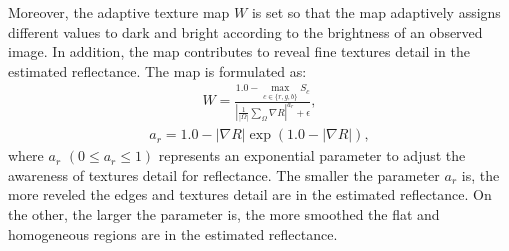 \documentclass[a4paper,twocolumn,10pt]{article}
\begin{document}
Moreover, the adaptive texture map $W$ is set so that the map adaptively assigns different values to dark and bright according to the brightness of an observed image. In addition, the map contributes to reveal fine textures detail in the estimated reflectance. The map is formulated as:
\vspace{-0.3cm}
\begin{eqnarray}
W = \frac{1.0 - \max_{c \in \{r, g, b\}}{S_{c}}}{\left |\frac{1}{|\Omega|}\sum_{\Omega}\nabla{R} \right|^{a_{r}} + \epsilon}, \label{eq:proposed/adaptive}
\end{eqnarray}
\vspace{-0.4cm}
\begin{eqnarray}
a_{r} = 1.0 - |\nabla{R}|\exp(1.0 - |\nabla{R}|), \label{eq:adaptive/parameter}
\end{eqnarray}
where $a_{r}$ $(0 \leq a_{r} \leq 1)$ represents an exponential parameter to adjust the awareness of textures detail for reflectance. The smaller the parameter $a_{r}$ is, the more reveled the edges and textures detail are in the estimated reflectance. On the other, the larger the parameter is, the more smoothed the flat and homogeneous regions are in the estimated reflectance.
\vspace{0.1cm}
\end{document}
